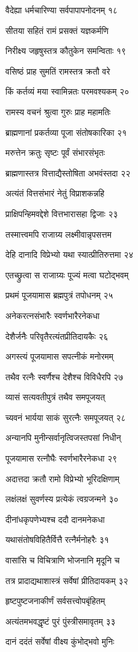 वैदेह्या धर्मचारिण्या सर्वपापापनोदनम् १८

सीतया सहितं रामं प्रसक्तं यज्ञकर्मणि

निरीक्ष्य जहृषुस्तत्र कौतुकेन समन्विताः १९

वसिष्ठं प्राह सुमतिं रामस्तत्र क्रतौ वरे

किं कर्तव्यं मया स्वामिन्नतः परमवश्यकम् २०

रामस्य वचनं श्रुत्वा गुरुः प्राह महामतिः

ब्राह्मणानां प्रकर्तव्या पूजा संतोषकारिका २१

मरुत्तेन क्रतुः सृष्टः पूर्वं संभारसंभृतः

ब्राह्मणास्तत्र वित्ताद्यैस्तोषिता अभवंस्तदा २२

अत्यंतं वित्तसंभारं नेतुं विप्राशकन्नहि

प्राक्षिपन्हिमवद्देशे वित्तभारासहा द्विजाः २३

तस्मात्त्वमपि राजाग्र्य लक्ष्मीवान्नृपसत्तम

देहि दानादि विप्रेभ्यो यथा स्यात्प्रीतिरुत्तमा २४

एतच्छ्रुत्वा स राजाग्र्यः पूज्यं मत्वा घटोद्भवम्

प्रथमं पूजयामास ब्रह्मपुत्रं तपोधनम् २५

अनेकरत्नसंभारैः स्वर्णभारैरनेकधा

देशैर्जनैः परिवृतैरत्यंतप्रीतिदायकैः २६

अगस्त्यं पूजयामास सपत्नीकं मनोरमम्

तथैव रत्नैः स्वर्णैश्च देशैश्च विविधैरपि २७

व्यासं सत्यवतीपुत्रं तथैव समपूजयत्

च्यवनं भार्यया साकं सुरत्नैः समपूजयत् २८

अन्यानपि मुनीन्सर्वानृत्विजस्तपसां निधीन्

पूजयामास रत्नौघैः स्वर्णभारैरनेकधा २९

अदात्तदा क्रतौ रामो विप्रेभ्यो भूरिदक्षिणाम्

लक्षंलक्षं सुवर्णस्य प्रत्येकं त्वग्रजन्मने ३०

दीनांधकृपणेभ्यश्च ददौ दानमनेकधा

यथासंतोषविहितैर्वित्तै रत्नैर्मनोहरैः ३१

वासांसि च विचित्राणि भोजनानि मृदूनि च

तत्र प्रादाद्यथाशास्त्रं सर्वेषां प्रीतिदायकम् ३२

हृष्टपुष्टजनाकीर्णं सर्वसत्त्वोपबृंहितम्

अत्यंतमभवद्धृष्टं पुरं पुंस्त्रीसमावृतम् ३३

दानं ददंतं सर्वेषां वीक्ष्य कुंभोद्भवो मुनिः

